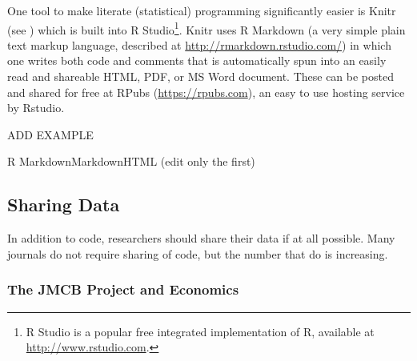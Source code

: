 \documentclass[12pt] {article}
\begin{document}
One tool to make literate (statistical) programming significantly easier
is Knitr (see \cite{xie_dynamic_2013, xie_knitr:_2014}) which is built into R
Studio\footnote{R Studio is a popular free integrated implementation of
  R, available at \href{stylesWithEffects.xml}{http://www.rstudio.com}.}.
Knitr uses R Markdown (a very simple plain text markup language,
described at \url{http://rmarkdown.rstudio.com/}) in which one writes
both code and comments that is automatically spun into an easily read
and shareable HTML, PDF, or MS Word document. These can be posted and
shared for free at RPubs (\url{https://rpubs.com}), an easy to use
hosting service by Rstudio.

ADD EXAMPLE

R MarkdownMarkdownHTML (edit only the first)

\subsection{Sharing Data}\label{sharing-data}

In addition to code, researchers should share their data if at all
possible. Many journals do not require sharing of code, but the number
that do is increasing.

\subsubsection{The JMCB Project and
Economics}\label{the-jmcb-project-and-economics}
\end{document}
